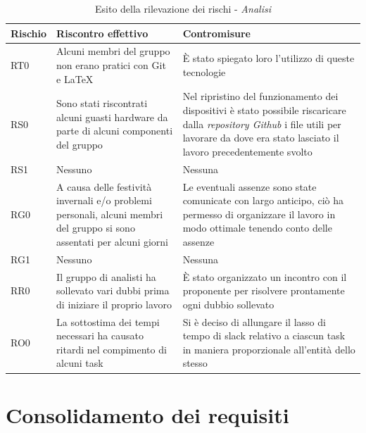 \documentclass[./PianodiProgetto.tex]{subfiles}
\begin{document}
\begin{longtable}{|p{15mm}|p{60mm}|p{60mm}|}
	\caption{Esito della rilevazione dei rischi - \textit{Analisi}} \\
	\hline \textbf{Rischio} & \textbf{Riscontro effettivo} & \textbf{Contromisure} \\
	
	\hline RT0 & Alcuni membri del gruppo non erano pratici con Git e \LaTeX &  È stato spiegato loro l'utilizzo di queste tecnologie \\
	
	\hline RS0 & Sono stati riscontrati alcuni guasti hardware da parte di alcuni componenti del gruppo & Nel ripristino del funzionamento dei dispositivi è stato possibile riscaricare dalla \textit{repository Github} i file utili per lavorare da dove era stato lasciato il lavoro precedentemente svolto \\
	
	\hline RS1 & Nessuno & Nessuna \\
	
	\hline RG0 & A causa delle festività invernali e/o problemi personali, alcuni membri del gruppo si sono assentati per alcuni giorni & Le eventuali assenze sono state comunicate con largo anticipo, ciò ha permesso di organizzare il lavoro in modo ottimale tenendo conto delle assenze \\
	
	\hline RG1 & Nessuno & Nessuna \\
	
	\hline RR0 & Il gruppo di analisti ha sollevato vari dubbi prima di iniziare il proprio lavoro & È stato organizzato un incontro con il proponente per risolvere prontamente ogni dubbio sollevato \\
	
	\hline RO0 & La sottostima dei tempi necessari ha causato ritardi nel compimento di alcuni task & Si è deciso di allungare il lasso di tempo di slack relativo a ciascun task in maniera proporzionale all'entità dello stesso \\
	
	\hline
\end{longtable}

\section{Consolidamento dei requisiti}

\setlength\LTleft{-5.5mm}
\end{document}
